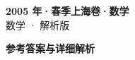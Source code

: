 \documentclass[zihao=-4, a4paper]{ctexart}
\begin{document}
\begin{center}
  {\Large\bfseries 2005 年·春季上海卷·数学}\\[4pt]
  {\large 数学 · 解析版}
\end{center}
\medskip
{}

\clearpage
{}
\begin{center}{\Large\bfseries 参考答案与详细解析}\end{center}
\medskip

\end{document}
